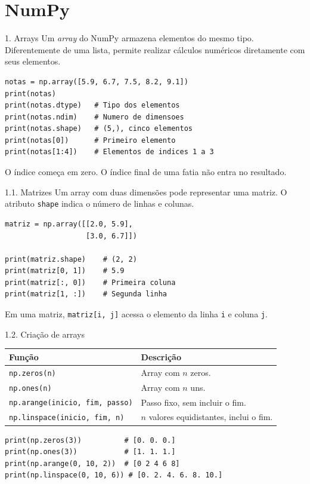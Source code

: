 \section{NumPy}

\begin{frame}[fragile,t,label=cd-numpy]{1. Arrays}
Um \textit{array} do NumPy armazena elementos do mesmo tipo. Diferentemente de uma lista, permite realizar cálculos numéricos diretamente com seus elementos.
\begin{lstlisting}
notas = np.array([5.9, 6.7, 7.5, 8.2, 9.1])
print(notas)
print(notas.dtype)   # Tipo dos elementos
print(notas.ndim)    # Numero de dimensoes
print(notas.shape)   # (5,), cinco elementos
print(notas[0])      # Primeiro elemento
print(notas[1:4])    # Elementos de indices 1 a 3
\end{lstlisting}
\begin{EMASCnote}
O índice começa em zero. O índice final de uma fatia não entra no resultado.
\end{EMASCnote}
\end{frame}

\begin{frame}[fragile,t]{1.1. Matrizes}
Um array com duas dimensões pode representar uma matriz. O atributo \texttt{shape} indica o número de linhas e colunas.
\begin{lstlisting}
matriz = np.array([[2.0, 5.9],
                   [3.0, 6.7]])

print(matriz.shape)    # (2, 2)
print(matriz[0, 1])    # 5.9
print(matriz[:, 0])    # Primeira coluna
print(matriz[1, :])    # Segunda linha
\end{lstlisting}
\begin{EMASCnote}
Em uma matriz, \texttt{matriz[i, j]} acessa o elemento da linha \texttt{i} e coluna \texttt{j}.
\end{EMASCnote}
\end{frame}

\begin{frame}[fragile,t]{1.2. Criação de arrays}
\begin{tabularx}{\linewidth}{@{}lX@{}}
\toprule
\textbf{Função} & \textbf{Descrição} \\
\midrule
\texttt{np.zeros(n)} & Array com $n$ zeros. \\
\texttt{np.ones(n)} & Array com $n$ uns. \\
\texttt{np.arange(inicio, fim, passo)} & Passo fixo, sem incluir o fim. \\
\texttt{np.linspace(inicio, fim, n)} & $n$ valores equidistantes, inclui o fim. \\
\bottomrule
\end{tabularx}
\begin{lstlisting}
print(np.zeros(3))          # [0. 0. 0.]
print(np.ones(3))           # [1. 1. 1.]
print(np.arange(0, 10, 2))  # [0 2 4 6 8]
print(np.linspace(0, 10, 6)) # [0. 2. 4. 6. 8. 10.]
\end{lstlisting}
\end{frame}

